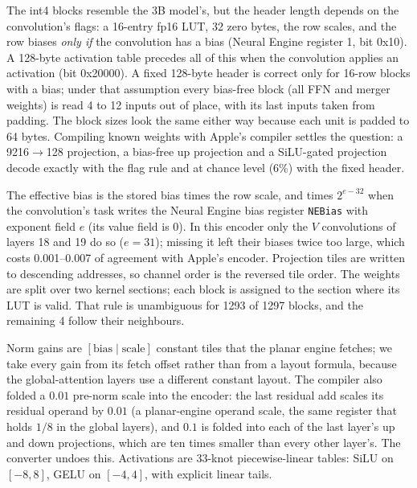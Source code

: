 \documentclass[11pt,reqno]{amsart}
\makeatletter
\newcommand{\code}[1]{\texttt{#1}}
\renewcommand\paragraph{\@startsection{paragraph}{4}\z@{.6\linespacing\@plus.2\linespacing}{-\fontdimen2\font}{\normalfont\bfseries}}
\theoremstyle{definition}
\makeatother
\begin{document}
\paragraph{Reading the weights.} The int4 blocks resemble the 3B model's, but the header length depends on the convolution's flags: a 16-entry fp16 LUT, 32 zero bytes, the row scales, and the row biases \emph{only if} the convolution has a bias (Neural Engine register 1, bit 0x10). A 128-byte activation table precedes all of this when the convolution applies an activation (bit 0x20000). A fixed 128-byte header is correct only for 16-row blocks with a bias; under that assumption every bias-free block (all FFN and merger weights) is read 4 to 12 inputs out of place, with its last inputs taken from padding. The block sizes look the same either way because each unit is padded to 64 bytes. Compiling known weights with Apple's compiler settles the question: a 9216$\to$128 projection, a bias-free up projection and a SiLU-gated projection decode exactly with the flag rule and at chance level (6\%) with the fixed header.

The effective bias is the stored bias times the row scale, and times $2^{e-32}$ when the convolution's task writes the Neural Engine bias register \code{NEBias} with exponent field $e$ (its value field is 0). In this encoder only the $V$ convolutions of layers 18 and 19 do so ($e=31$); missing it left their biases twice too large, which costs 0.001--0.007 of agreement with Apple's encoder. Projection tiles are written to descending addresses, so channel order is the reversed tile order. The weights are split over two kernel sections; each block is assigned to the section where its LUT is valid. That rule is unambiguous for 1293 of 1297 blocks, and the remaining 4 follow their neighbours.

Norm gains are $[\text{bias}\mid\text{scale}]$ constant tiles that the planar engine fetches; we take every gain from its fetch offset rather than from a layout formula, because the global-attention layers use a different constant layout. The compiler also folded a $0.01$ pre-norm scale into the encoder: the last residual add scales its residual operand by $0.01$ (a planar-engine operand scale, the same register that holds $1/8$ in the global layers), and $0.1$ is folded into each of the last layer's up and down projections, which are ten times smaller than every other layer's. The converter undoes this. Activations are 33-knot piecewise-linear tables: SiLU on $[-8,8]$, GELU on $[-4,4]$, with explicit linear tails.
\end{document}
